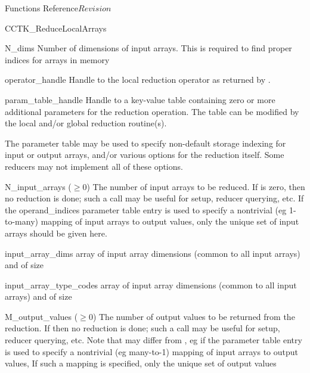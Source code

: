 \begin{cactuspart}{ Functions Reference}{}{$Revision$}
\begin{FunctionDescription}{CCTK\_ReduceLocalArrays}
\begin{ParameterSection}
\begin{Parameter}{N\_dims}
Number of dimensions of input arrays. This is required to find proper indices
for arrays in memory
\end{Parameter}
\begin{Parameter}{operator\_handle}
Handle to the local reduction operator as returned by \newline
{}.
\end{Parameter}
\begin{Parameter}{param\_table\_handle}
Handle to a key-value table containing zero or more additional parameters
for the reduction operation. The table can be modified by the local
and/or global reduction routine(s).

The parameter table may be used to specify non-default storage indexing
for input or output arrays, and/or various options for the reduction
itself.  Some reducers may not implement all of these options.
\begin{Parameter}{N\_input\_arrays ($\ge 0$)}
The number of input arrays to be reduced.  If   is zero,
then no reduction is done; such a call may be useful for setup,
reducer querying, etc.  If the  operand\_indices  parameter table
entry is used to specify a nontrivial (eg 1-to-many) mapping of input
arrays to output values, only the unique set of input arrays should
be given here.
\end{Parameter}
\begin{Parameter}{input\_array\_dims}
array of input array dimensions (common to all input arrays) and of size 
\end{Parameter}
\end{Parameter}
\begin{Parameter}{input\_array\_type\_codes}
array of input array dimensions (common to all input arrays) and of size 
\end{Parameter}
\begin{Parameter}{M\_output\_values ($\ge 0$)}
The number of output values to be returned from the reduction.
If   then no reduction is done; such a call
may be useful for setup, reducer querying, etc.  Note that
  may differ from   , eg if the
  parameter table entry is used to specify a
nontrivial (eg many-to-1) mapping of input arrays to output values,
If such a mapping is specified, only the unique set of output values

\end{Parameter}
\end{ParameterSection}
\end{FunctionDescription}
\end{cactuspart}
